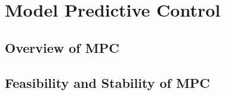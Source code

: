 \newpage

\section{Model Predictive Control}

\subsection{Overview of MPC}

\subsection{Feasibility and Stability of MPC}